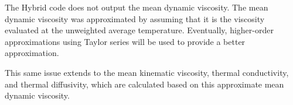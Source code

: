 The Hybrid code does not output the mean dynamic viscosity.  The mean dynamic
viscosity was approximated by assuming that it is the viscosity evaluated at
the unweighted average temperature.  Eventually, higher-order approximations
using Taylor series will be used to provide a better approximation.

This same issue extends to the mean kinematic viscosity, thermal conductivity,
and thermal diffusivity, which are calculated based on this approximate mean
dynamic viscosity.
